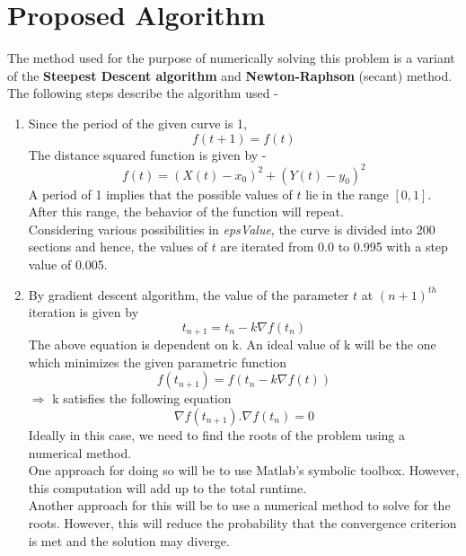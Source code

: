 \documentclass[12pt]{article}
\begin{document}
\section*{Proposed Algorithm}
The method used for the purpose of numerically solving this problem is a variant of the \textbf{Steepest Descent algorithm} and \textbf{Newton-Raphson} (secant) method. \\
The following steps describe the algorithm used -
\begin{enumerate}
    \item Since the period of the given curve is 1, 
    \begin{equation}
        f(t+1) = f(t)
    \end{equation}
    The distance squared function is given by -
    \begin{equation}
        f(t) = (X(t) - x_0)^2 + (Y(t) - y_0)^2
    \end{equation}
    A period of 1 implies that the possible values of $t$ lie in the range $[0,1]$. After this range, the behavior of the function will repeat. \\
	Considering various possibilities in \textit{epsValue}, the curve is divided into 200 sections and hence, the values of $t$ are iterated from 0.0 to 0.995 with a step value of 0.005.
    
    \item
    By gradient descent algorithm, the value of the parameter $t$ at $(n+1)^{th}$ iteration is given by
    \begin{equation}
        t_{n+1} = t_n - k\nabla f(t_n)
    \end{equation}
    The above equation is dependent on k. An ideal value of k will be the one which minimizes the given parametric function
    \begin{equation}
        f(t_{n+1}) = f(t_n - k\nabla f(t))
    \end{equation}
    $\Rightarrow$ k satisfies the following equation
    \begin{equation}
        \nabla f(t_{n+1}) . \nabla f(t_n) = 0
    \end{equation} 
    Ideally in this case, we need to find the roots of the problem using a numerical method. \\
    One approach for doing so will be to use Matlab's symbolic toolbox. However, this computation will add up to the total runtime. \\
    Another approach for this will be to use a numerical method to solve for the roots. However, this will reduce the probability that the convergence criterion is met and the solution may diverge.
    

\end{enumerate}
\end{document}
